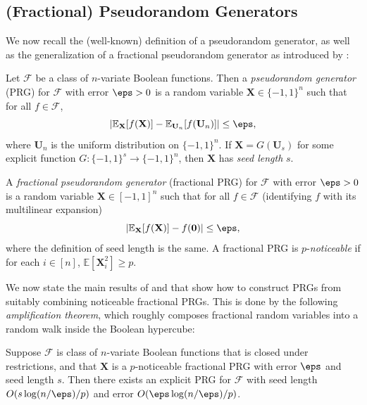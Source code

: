\subsection{(Fractional) Pseudorandom Generators}
We now recall the (well-known) definition of a pseudorandom generator, as well as the generalization of a fractional pseudorandom generator as introduced by \cite{CHHL}:

\begin{definition}
Let $\mathcal{F}$ be a class of $n$-variate Boolean functions. Then a \emph{pseudorandom generator} (PRG) for $\mathcal{F}$ with error $\eps>0$ is a random variable $\mathbf{X}\in \{-1,1\}^n$ such that for all $f\in \mathcal{F}$,
\begin{equation*}
    \vert \mathbb{E}_{\mathbf{X}}[f(\mathbf{X})]-\mathbb{E}_{\mathbf{U}_n}[f(\mathbf{U}_n)]\vert \leq \eps,
\end{equation*}
where $\mathbf{U}_n$ is the uniform distribution on $\{-1,1\}^n$. If $\mathbf{X}=G(\mathbf{U}_s)$ for some explicit function $G:\{-1,1\}^s\to \{-1,1\}^n$, then $\mathbf{X}$ has \emph{seed length} $s$.
\end{definition}

\begin{definition}\label{def:fprg}
A \emph{fractional pseudorandom generator} (fractional PRG) for $\mathcal{F}$ with error $\eps>0$ is a random variable $\mathbf{X}\in [-1,1]^n$ such that for all $f\in \mathcal{F}$ (identifying $f$ with its multilinear expansion)
\begin{equation*}
    \vert \mathbb{E}_{\mathbf{X}}[f(\mathbf{X})]-f(\mathbf{0})\vert \leq \eps,
\end{equation*}
where the definition of seed length is the same. A fractional PRG is $p$-\emph{noticeable} if for each $i\in [n]$, $\mathbb{E}[\mathbf{X}_i^2]\geq p$.
\end{definition}

We now state the main results of \cite{CHHL} and \cite{CHLT} that show how to construct PRGs from suitably combining noticeable fractional PRGs. This is done by the following \emph{amplification theorem}, which roughly composes fractional random variables into a random walk inside the Boolean hypercube:

\begin{THM}
\label{thm:amplification}
Suppose $\mathcal{F}$ is class of $n$-variate Boolean functions that is closed under restrictions, and that $\mathbf{X}$ is a $p$-noticeable fractional PRG with error $\eps$ and seed length $s$. Then there exists an explicit PRG for $\mathcal{F}$ with seed length $O(s\log(n/\eps)/p)$ and error $O(\eps\log(n/\eps)/p)$.
\end{THM}


